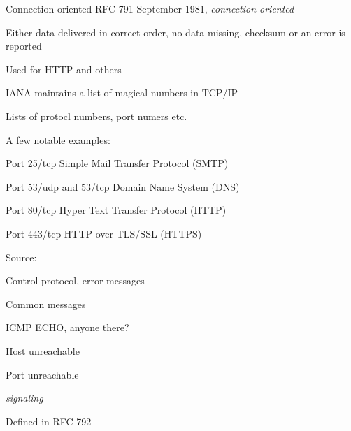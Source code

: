 \documentclass[Screen16to9,17pt]{foils}
\begin{document}

\begin{list1}
\item Connection oriented RFC-791 September 1981, \emph{connection-oriented}
\item Either data delivered in correct order, no data missing, checksum or an error is reported
\item Used for HTTP and others
\end{list1}




\begin{list1}
\item IANA maintains a list of magical numbers in TCP/IP
\item Lists of protocl numbers, port numers etc.
\item A few notable examples:
\begin{list2}
\item Port 25/tcp Simple Mail Transfer Protocol (SMTP)
\item Port 53/udp and 53/tcp Domain Name System (DNS)
\item Port 80/tcp Hyper Text Transfer Protocol (HTTP)
\item Port 443/tcp HTTP over TLS/SSL (HTTPS)
\end{list2}
\item Source: 
\end{list1}




\begin{list1}
\item Control protocol, error messages
\item Common messages
\begin{list2}
\item ICMP ECHO, anyone there?
\item Host unreachable
\item Port unreachable
\end{list2}
\item \emph{signaling}
\item Defined in RFC-792
\end{list1}


\end{document}
